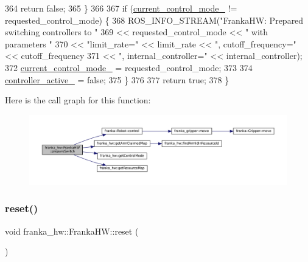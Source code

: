 \begin{DoxyCode}
364       \textcolor{keywordflow}{return} \textcolor{keyword}{false};
365   \}
366 
367   \textcolor{keywordflow}{if} (\hyperlink{classfranka__hw_1_1FrankaHW_a4eb4ed0043449742cadefa5809d9c6f0}{current\_control\_mode\_} != requested\_control\_mode) \{
368     ROS\_INFO\_STREAM(\textcolor{stringliteral}{"FrankaHW: Prepared switching controllers to "}
369                     << requested\_control\_mode << \textcolor{stringliteral}{" with parameters "}
370                     << \textcolor{stringliteral}{"limit\_rate="} << limit\_rate << \textcolor{stringliteral}{", cutoff\_frequency="} << cutoff\_frequency
371                     << \textcolor{stringliteral}{", internal\_controller="} << internal\_controller);
372     \hyperlink{classfranka__hw_1_1FrankaHW_a4eb4ed0043449742cadefa5809d9c6f0}{current\_control\_mode\_} = requested\_control\_mode;
373 
374     \hyperlink{classfranka__hw_1_1FrankaHW_aa207ee4ba133fdb1b3887c9639b47b40}{controller\_active\_} = \textcolor{keyword}{false};
375   \}
376 
377   \textcolor{keywordflow}{return} \textcolor{keyword}{true};
378 \}
\end{DoxyCode}
Here is the call graph for this function\+:
\nopagebreak
\begin{figure}[H]
\begin{center}
\leavevmode
\includegraphics[width=350pt]{classfranka__hw_1_1FrankaHW_ab73b14d5f8481cd3cb3d670aeae2de06_cgraph}
\end{center}
\end{figure}
\mbox{\label{classfranka__hw_1_1FrankaHW_aaa0bc020099cb6dba41728252d0c7df4}} 
\subsubsection{\texorpdfstring{reset()}{reset()}}
{\footnotesize\ttfamily void franka\+\_\+hw\+::\+Franka\+H\+W\+::reset (\begin{DoxyParamCaption}{ }\end{DoxyParamCaption})}

